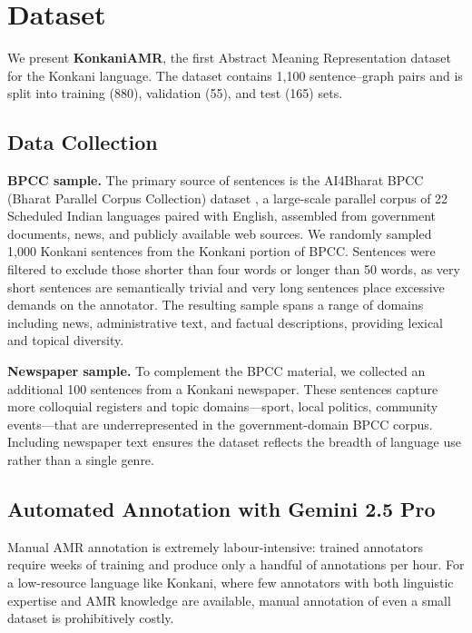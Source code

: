 \section{Dataset}
\label{sec:dataset}

We present \textbf{KonkaniAMR}, the first Abstract Meaning Representation dataset for the Konkani language. The dataset contains 1,100 sentence–graph pairs and is split into training (880), validation (55), and test (165) sets.

\subsection{Data Collection}

\textbf{BPCC sample.} The primary source of sentences is the AI4Bharat BPCC (Bharat Parallel Corpus Collection) dataset \cite{gala2023indictrans2}, a large-scale parallel corpus of 22 Scheduled Indian languages paired with English, assembled from government documents, news, and publicly available web sources. We randomly sampled 1,000 Konkani sentences from the Konkani portion of BPCC. Sentences were filtered to exclude those shorter than four words or longer than 50 words, as very short sentences are semantically trivial and very long sentences place excessive demands on the annotator. The resulting sample spans a range of domains including news, administrative text, and factual descriptions, providing lexical and topical diversity.

\textbf{Newspaper sample.} To complement the BPCC material, we collected an additional 100 sentences from a Konkani newspaper. These sentences capture more colloquial registers and topic domains—sport, local politics, community events—that are underrepresented in the government-domain BPCC corpus. Including newspaper text ensures the dataset reflects the breadth of language use rather than a single genre.

\subsection{Automated Annotation with Gemini 2.5 Pro}

Manual AMR annotation is extremely labour-intensive: trained annotators require weeks of training and produce only a handful of annotations per hour. For a low-resource language like Konkani, where few annotators with both linguistic expertise and AMR knowledge are available, manual annotation of even a small dataset is prohibitively costly.

